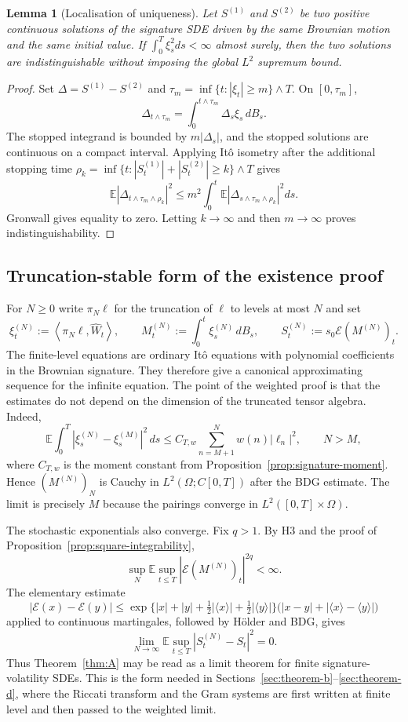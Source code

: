 \documentclass[11pt,oneside]{article}
\theoremstyle{plain}
\newtheorem{lemma}[theorem]{Lemma}
\theoremstyle{definition}
\theoremstyle{remark}
\newcommand{\E}{\mathbb{E}}
\newcommand{\cW}{\widehat W}
\newcommand{\abs}[1]{\left\lvert #1\right\rvert}
\newcommand{\inner}[2]{\left\langle #1,#2\right\rangle}
\begin{document}
\begin{lemma}[Localisation of uniqueness]
\label{lem:localisation-uniqueness-expanded}
Let $S^{(1)}$ and $S^{(2)}$ be two positive continuous solutions of the signature SDE driven by the same Brownian motion and the same initial value. If $\int_0^T\xi_s^2ds<\infty$ almost surely, then the two solutions are indistinguishable without imposing the global $L^2$ supremum bound.
\end{lemma}

\begin{proof}
Set $\Delta=S^{(1)}-S^{(2)}$ and $\tau_m=\inf\{t:\abs{\xi_t}\geq m\}\wedge T$. On $[0,\tau_m]$,
\[
\Delta_{t\wedge\tau_m}=\int_0^{t\wedge\tau_m}\Delta_s\xi_s\,dB_s.
\]
The stopped integrand is bounded by $m\abs{\Delta_s}$, and the stopped solutions are continuous on a compact interval. Applying It\^o isometry after the additional stopping time $\rho_k=\inf\{t:\abs{S^{(1)}_t}+\abs{S^{(2)}_t}\geq k\}\wedge T$ gives
\[
\E\abs{\Delta_{t\wedge\tau_m\wedge\rho_k}}^2
\leq m^2\int_0^t\E\abs{\Delta_{s\wedge\tau_m\wedge\rho_k}}^2ds.
\]
Gronwall gives equality to zero. Letting $k\to\infty$ and then $m\to\infty$ proves indistinguishability.
\end{proof}


\subsection{Truncation-stable form of the existence proof}
\label{subsec:truncation-stable-existence}
For $N\geq0$ write $\pi_N\ell$ for the truncation of $\ell$ to levels at most $N$ and set
\[
\xi_t^{(N)}:=\inner{\pi_N\ell}{\cW_t},\qquad
M_t^{(N)}:=\int_0^t \xi_s^{(N)}\,dB_s,
\qquad
S_t^{(N)}:=s_0\mathcal E(M^{(N)})_t .
\]
The finite-level equations are ordinary It\^o equations with polynomial coefficients in the Brownian signature. They therefore give a canonical approximating sequence for the infinite equation. The point of the weighted proof is that the estimates do not depend on the dimension of the truncated tensor algebra. Indeed,
\[
\E\int_0^T \abs{\xi_s^{(N)}-\xi_s^{(M)}}^2\,ds
\leq C_{T,w}\sum_{n=M+1}^{N} w(n)\abs{\ell_n}^2,
\qquad N>M,
\]
where $C_{T,w}$ is the moment constant from Proposition~\ref{prop:signature-moment}. Hence $(M^{(N)})_N$ is Cauchy in $L^2(\Omega;C[0,T])$ after the BDG estimate. The limit is precisely $M$ because the pairings converge in $L^2([0,T]\times\Omega)$.

The stochastic exponentials also converge. Fix $q>1$. By H3 and the proof of Proposition~\ref{prop:square-integrability},
\[
\sup_N \E\sup_{t\leq T}\abs{\mathcal E(M^{(N)})_t}^{2q}<\infty .
\]
The elementary estimate
\[
\abs{\mathcal E(x)-\mathcal E(y)}
\leq \exp\{\abs{x}+\abs{y}+\tfrac12\abs{\langle x\rangle}+\tfrac12\abs{\langle y\rangle}\}
\bigl(\abs{x-y}+\abs{\langle x\rangle-\langle y\rangle}\bigr)
\]
applied to continuous martingales, followed by H\"older and BDG, gives
\[
\lim_{N\to\infty}\E\sup_{t\leq T}\abs{S_t^{(N)}-S_t}^2=0 .
\]
Thus Theorem~\ref{thm:A} may be read as a limit theorem for finite signature-volatility SDEs. This is the form needed in Sections~\ref{sec:theorem-b}--\ref{sec:theorem-d}, where the Riccati transform and the Gram systems are first written at finite level and then passed to the weighted limit.
\end{document}
